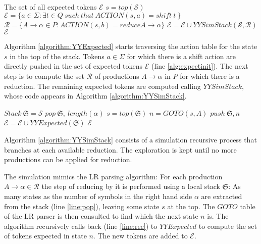 \begin{algorithm}[h] 
\caption{$YYExpected(\mathcal{S})$}
\label{algorithm:YYExpected}
\begin{algorithmic}[1]
\ENSURE The set of all expected tokens $\mathcal{E}$
\STATE $s = top(\mathcal{S})$
\STATE  $\mathcal{E} = \{ a \in \Sigma : \exists t \in Q\ such\ that\ ACTION(s, a) = shift\ t\ \}$ \label{alg:expectinit}
\STATE  $\mathcal{R} = \{  A \rightarrow \alpha \in P : ACTION(s, b) = reduce  A \rightarrow \alpha \}$
  \STATE $\mathcal{E} = \mathcal{E} \cup YYSimStack(\mathcal{S}, \mathcal{R})$
\ENDIF
\RETURN $\mathcal{E}$
\end{algorithmic}
\end{algorithm}
Algorithm \ref{algorithm:YYExpected}  starts traversing the action table for the
state $s$ in the top of the stack. Tokens $a \in \Sigma$ 
for which there is a shift action 
are directly pushed in the set of expected 
tokens $\mathcal{E}$ (line \ref{alg:expectinit}). 
The next step is to compute the set $\mathcal{R}$ of productions $A \rightarrow \alpha$  in
$P$ for which there
is a reduction. The remaining expected tokens
are computed calling $YYSimStack$, whose code appears in
Algorithm \ref{algorithm:YYSimStack}.

\begin{algorithm}[h]
\caption{$YYSimStack(\mathcal{S}, \mathcal{R})$}
\label{algorithm:YYSimStack}
\begin{algorithmic}[1]
      \STATE $Stack\ \mathfrak{S} = \mathcal{S}$
      \STATE \label{line:pop} $pop\ \mathfrak{S},\  length(\alpha)$
      \STATE $s = top(\mathfrak{S})$
      \STATE $n = GOTO(s, A)$
      \STATE $push\ \mathfrak{S}, n$
      \STATE \label{line:rec}$\mathcal{E} = \mathcal{E} \cup YYExpected(\mathfrak{S})$
    \ENDIF
 \ENDFOR
 \RETURN $\mathcal{E}$
\end{algorithmic}
\end{algorithm}

Algorithm \ref{algorithm:YYSimStack} 
consists of a simulation recursive process that 
branches at each available reduction.
The exploration is kept until no more 
productions can be applied for reduction.

The simulation mimics the LR parsing algorithm:
For each production $A \rightarrow \alpha \in \mathcal{R}$
the step of reducing by it is performed using a local stack 
$\mathfrak{S}$: As many states as the number of symbols in  the right hand side 
$\alpha$ are extracted from the stack (line \ref{line:pop}), leaving some state $s$ at the top.
The $GOTO$ table of the LR parser is then consulted to find which the 
next state $n$ is. The algorithm recursively calls back (line \ref{line:rec}) to 
$YYExpected$ %
 to compute
the set of tokens expected in state $n$. The new tokens are added
to $\mathcal{E}$.
